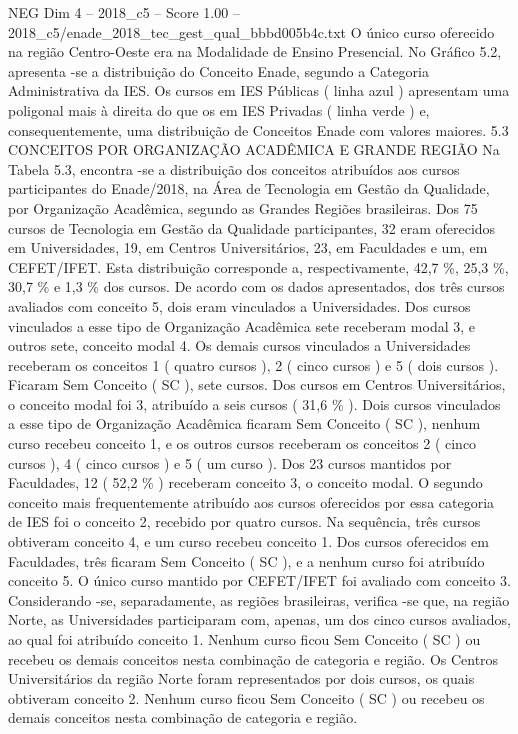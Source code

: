 \begin{textsample}{NEG Dim 4 – 2018\_c5 – Score 1.00 – 2018\_c5/enade\_2018\_tec\_gest\_qual\_bbbd005b4c.txt}
O único curso oferecido na região Centro-Oeste era na Modalidade de Ensino Presencial.
No Gráfico 5.2, apresenta -se a distribuição do Conceito Enade, segundo a Categoria Administrativa da IES.
Os cursos em IES Públicas ( linha azul ) apresentam uma poligonal mais à direita do que os em IES Privadas ( linha verde ) e, consequentemente, uma distribuição de Conceitos Enade com valores maiores. 5.3 CONCEITOS POR ORGANIZAÇÃO ACADÊMICA E GRANDE REGIÃO Na Tabela 5.3, encontra -se a distribuição dos conceitos atribuídos aos cursos participantes do Enade/2018, na Área de Tecnologia em Gestão da Qualidade, por Organização Acadêmica, segundo as Grandes Regiões brasileiras.
Dos 75 cursos de Tecnologia em Gestão da Qualidade participantes, 32 eram oferecidos em Universidades, 19, em Centros Universitários, 23, em Faculdades e um, em CEFET/IFET.
Esta distribuição corresponde a, respectivamente, 42,7 \%, 25,3 \%, 30,7 \% e 1,3 \% dos cursos.
De acordo com os dados apresentados, dos três cursos avaliados com conceito 5, dois eram vinculados a Universidades.
Dos cursos vinculados a esse tipo de Organização Acadêmica sete receberam modal 3, e outros sete, conceito modal 4.
Os demais cursos vinculados a Universidades receberam os conceitos 1 ( quatro cursos ), 2 ( cinco cursos ) e 5 ( dois cursos ).
Ficaram Sem Conceito ( SC ), sete cursos.
Dos cursos em Centros Universitários, o conceito modal foi 3, atribuído a seis cursos ( 31,6 \% ).
Dois cursos vinculados a esse tipo de Organização Acadêmica ficaram Sem Conceito ( SC ), nenhum curso recebeu conceito 1, e os outros cursos receberam os conceitos 2 ( cinco cursos ), 4 ( cinco cursos ) e 5 ( um curso ).
Dos 23 cursos mantidos por Faculdades, 12 ( 52,2 \% ) receberam conceito 3, o conceito modal.
O segundo conceito mais frequentemente atribuído aos cursos oferecidos por essa categoria de IES foi o conceito 2, recebido por quatro cursos.
Na sequência, três cursos obtiveram conceito 4, e um curso recebeu conceito 1.
Dos cursos oferecidos em Faculdades, três ficaram Sem Conceito ( SC ), e a nenhum curso foi atribuído conceito 5.
O único curso mantido por CEFET/IFET foi avaliado com conceito 3.
Considerando -se, separadamente, as regiões brasileiras, verifica -se que, na região Norte, as Universidades participaram com, apenas, um dos cinco cursos avaliados, ao qual foi atribuído conceito 1.
Nenhum curso ficou Sem Conceito ( SC ) ou recebeu os demais conceitos nesta combinação de categoria e região.
Os Centros Universitários da região Norte foram representados por dois cursos, os quais obtiveram conceito 2.
Nenhum curso ficou Sem Conceito ( SC ) ou recebeu os demais conceitos nesta combinação de categoria e região.

\end{textsample}
